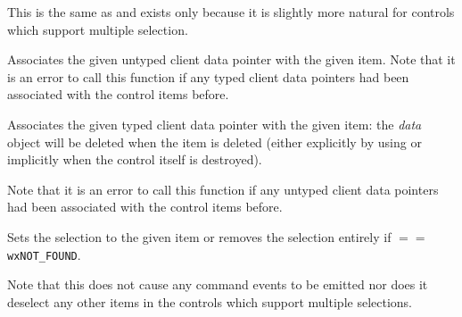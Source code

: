 
This is the same as  and
exists only because it is slightly more natural for controls which support
multiple selection.


\label{wxcontrolwithitemssetclientdata}


Associates the given untyped client data pointer with the given item. Note that
it is an error to call this function if any typed client data pointers had been
associated with the control items before.





\label{wxcontrolwithitemssetclientobject}


Associates the given typed client data pointer with the given item: the 
{\it data} object will be deleted when the item is deleted (either explicitly
by using  or implicitly when the
control itself is destroyed).

Note that it is an error to call this function if any untyped client data
pointers had been associated with the control items before.





\label{wxcontrolwithitemssetselection}


Sets the selection to the given item  or removes the selection entirely
if  $==$ {\tt wxNOT\_FOUND}.

Note that this does not cause any command events to be emitted nor does it
deselect any other items in the controls which support multiple selections.


